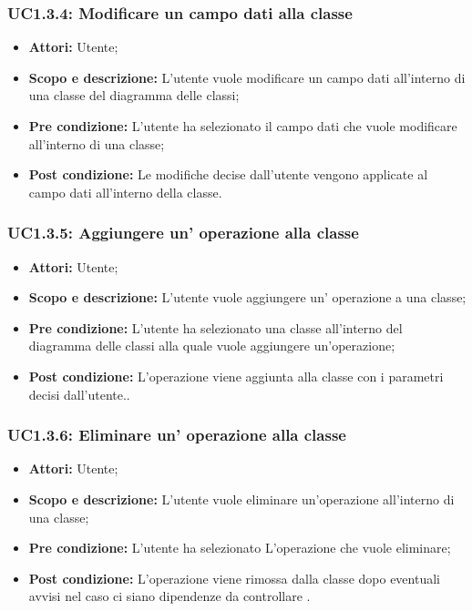 \documentclass[../AnalisiDeiRequisiti.tex]{subfiles}
\begin{document}
	\subsubsection{UC1.3.4: Modificare un campo dati alla classe}
	\begin{itemize}
		\item \textbf{Attori:} Utente;
		\item \textbf{Scopo e descrizione: }L'utente vuole modificare un campo dati all'interno di una classe del diagramma delle classi;
		\item \textbf{Pre condizione: }L'utente ha selezionato il campo dati che vuole modificare all'interno di una classe;
		\item \textbf{Post condizione: }Le modifiche decise dall'utente vengono applicate al campo dati all'interno della classe.
	\end{itemize}
	
	\subsubsection{UC1.3.5: Aggiungere un' operazione alla classe}
	\begin{itemize}
		\item \textbf{Attori:} Utente;
		\item \textbf{Scopo e descrizione: }L'utente vuole aggiungere un' operazione a una classe;
		\item \textbf{Pre condizione: }L'utente ha selezionato una classe all'interno del diagramma delle classi alla quale vuole aggiungere un'operazione;
		\item \textbf{Post condizione: }L'operazione viene aggiunta alla classe con i parametri decisi dall'utente..
	\end{itemize}
	
	\subsubsection{UC1.3.6: Eliminare un' operazione  alla classe}
	\begin{itemize}
		\item \textbf{Attori:} Utente;
		\item \textbf{Scopo e descrizione: }L'utente vuole eliminare un'operazione all'interno di una classe;
		\item \textbf{Pre condizione: }L'utente ha selezionato L'operazione che vuole eliminare;
		\item \textbf{Post condizione: }L'operazione viene rimossa dalla classe dopo eventuali avvisi nel caso ci siano dipendenze da controllare .
	\end{itemize}
	
\end{document}

